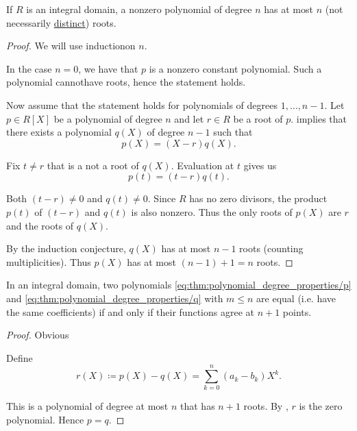\begin{proposition}\label{thm:integral_domain_polynomial_root_limit}
  If \( R \) is an integral domain, a nonzero polynomial of degree \( n \) has at most \( n \) (not necessarily \hyperref[def:polynomial_root_multiplicity]{distinct}) roots.
\end{proposition}
\begin{proof}
  We will use induction\IND on \( n \).

  In the case \( n = 0 \), we have that \( p \) is a nonzero constant polynomial. Such a polynomial cannot\LEM have roots, hence the statement holds.

  Now assume that the statement holds for polynomials of degrees \( 1, \ldots, n - 1 \). Let \( p \in R[X] \) be a polynomial of degree \( n \) and let \( r \in R \) be a root of \( p \).  implies that there exists a polynomial \( q(X) \) of degree \( n - 1 \) such that
  \begin{equation*}
    p(X) = (X - r) q(X).
  \end{equation*}

  Fix \( t \neq r \) that is a not a root of \( q(X) \). Evaluation at \( t \) gives us
  \begin{equation*}
    p(t) = (t - r) q(t).
  \end{equation*}

  Both \( (t - r) \neq 0 \) and \( q(t) \neq 0 \). Since \( R \) has no zero divisors, the product \( p(t) \) of \( (t - r) \) and \( q(t) \) is also nonzero. Thus the only roots of \( p(X) \) are \( r \) and the roots of \( q(X) \).

  By the induction conjecture, \( q(X) \) has at most \( n - 1 \) roots (counting multiplicities). Thus \( p(X) \) has at most \( (n - 1) + 1 = n \) roots.
\end{proof}

\begin{proposition}\label{thm:polynomials_with_identical_values}
  In an integral domain, two polynomials \eqref{eq:thm:polynomial_degree_properties/p} and \eqref{eq:thm:polynomial_degree_properties/q} with \( m \leq n \) are equal (i.e. have the same coefficients) if and only if their functions agree at \( n + 1 \) points.
\end{proposition}
\begin{proof}
  \SufficiencySubProof Obvious

  \NecessitySubProof Define
  \begin{equation*}
    r(X) \coloneqq p(X) - q(X) = \sum_{k=0}^n (a_k - b_k) X^k.
  \end{equation*}

  This is a polynomial of degree at most \( n \) that has \( n + 1 \) roots. By , \( r \) is the zero polynomial. Hence \( p = q \).
\end{proof}

